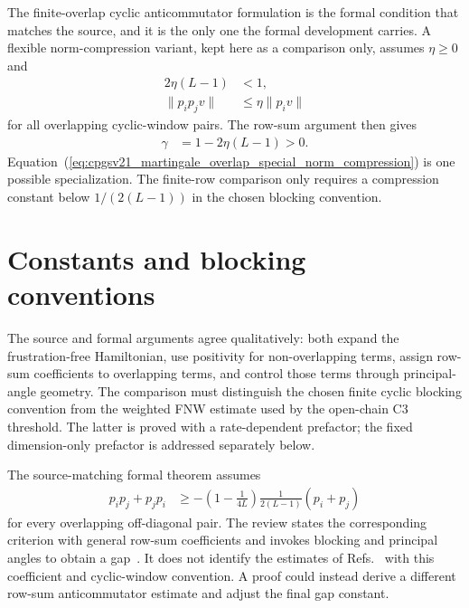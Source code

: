 \documentclass{article}
\begin{document}
The finite-overlap cyclic anticommutator formulation is the formal condition
that matches the source, and it is the only one the formal development carries.
A flexible norm-compression variant, kept here as a comparison only, assumes
$\eta\geq0$ and
\begin{align}
    2\eta(L-1)
     & <1,
    \label{eq:cpgsv21_martingale_overlap_eta_smallness} \\
    \lVert p_ip_jv\rVert
     & \leq\eta\lVert p_iv\rVert
    \label{eq:cpgsv21_martingale_overlap_eta_norm_compression}
\end{align}
for all overlapping cyclic-window pairs. The row-sum argument then gives
\begin{align}
    \gamma
     & =1-2\eta(L-1)>0.
    \label{eq:cpgsv21_martingale_overlap_eta_gap}
\end{align}
Equation~(\ref{eq:cpgsv21_martingale_overlap_special_norm_compression}) is one
possible specialization. The finite-row comparison only requires a compression
constant below $1/(2(L-1))$ in the chosen blocking convention.

\section{Constants and blocking conventions}

The source and formal arguments agree qualitatively: both expand the
frustration-free Hamiltonian, use positivity for non-overlapping terms, assign
row-sum coefficients to overlapping terms, and control those terms through
principal-angle geometry. The comparison must distinguish the chosen
finite cyclic blocking convention from the weighted FNW estimate used by the
open-chain C3 threshold. The latter is proved with a rate-dependent prefactor;
the fixed dimension-only prefactor is addressed separately below.

The source-matching formal theorem assumes
\begin{align}
    p_ip_j+p_jp_i
     & \geq
    -\left(1-\frac{1}{4L}\right)
    \frac{1}{2(L-1)}(p_i+p_j)
    \label{eq:cpgsv21_martingale_overlap_cyclic_anticommutator_target}
\end{align}
for every overlapping off-diagonal pair. The review states the corresponding
criterion with general row-sum coefficients and invokes blocking and principal
angles to obtain a gap~\cite[Section~IV.C]{Cirac2021Matrix}. It does not
identify the estimates of
Refs.~\cite{Fannes1992Finitely,Nachtergaele1996Spectral,Kastoryano2018Martingale}
with this coefficient and cyclic-window convention. A proof could instead
derive a different row-sum anticommutator estimate and adjust the final gap
constant.
\end{document}
